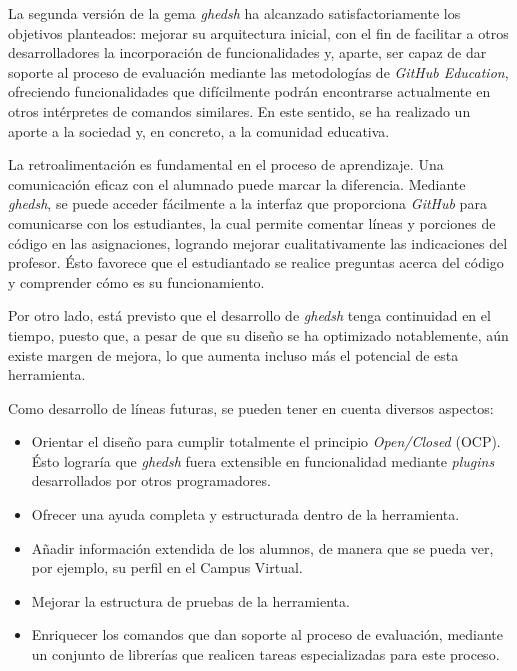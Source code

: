 

La segunda versión de la gema {\it ghedsh} ha alcanzado satisfactoriamente los objetivos planteados: mejorar su arquitectura inicial, con el fin de facilitar a otros desarrolladores
la incorporación de funcionalidades y, aparte, ser capaz de dar soporte al proceso de evaluación mediante las metodologías de {\it GitHub Education}, ofreciendo funcionalidades que difícilmente
podrán encontrarse actualmente en otros intérpretes de comandos similares. En este sentido, se ha realizado un aporte a la sociedad y, en concreto, a la comunidad educativa.
\bigskip

La retroalimentación es fundamental en el proceso de aprendizaje. Una comunicación eficaz con el alumnado puede marcar la diferencia. Mediante {\it ghedsh}, se puede acceder fácilmente a la interfaz que proporciona {\it GitHub} para comunicarse con los estudiantes, la cual permite comentar líneas y porciones de código en las asignaciones, logrando
mejorar cualitativamente las indicaciones del profesor. Ésto favorece que el estudiantado se realice preguntas acerca del código y comprender cómo es su funcionamiento.
\bigskip

Por otro lado, está previsto que el desarrollo de {\it ghedsh} tenga continuidad en el tiempo, puesto que, a pesar de que su diseño se ha optimizado notablemente, aún existe margen de mejora, lo que aumenta incluso más el potencial de esta herramienta.
\bigskip

Como desarrollo de líneas futuras, se pueden tener en cuenta diversos aspectos:
\begin{itemize}
	\item Orientar el diseño para cumplir totalmente el principio {\it Open/Closed} (OCP). Ésto lograría que {\it ghedsh} fuera extensible en funcionalidad mediante {\it plugins} desarrollados por otros programadores.
	\item Ofrecer una ayuda completa y estructurada dentro de la herramienta.
	\item Añadir información extendida de los alumnos, de manera que se pueda ver, por ejemplo, su perfil en el Campus Virtual.
	\item Mejorar la estructura de pruebas de la herramienta.
	\item Enriquecer los comandos que dan soporte al proceso de evaluación, mediante un conjunto de librerías que realicen tareas especializadas para este proceso.
\end{itemize}



